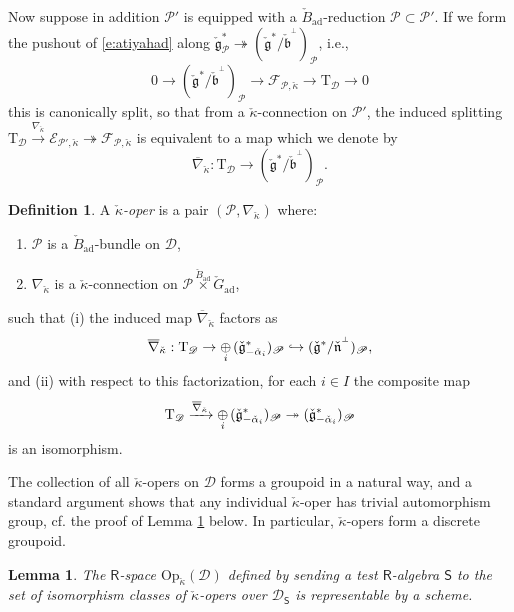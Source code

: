 \documentclass{amsart}
\newtheorem{Lem}[Thm]{Lemma}
\theoremstyle{definition}
\newtheorem{defi}[Thm]{Definition}
\newcommand{\fb}{\mathfrak{b}}
\newcommand{\fg}{\mathfrak{g}}
\newcommand{\sD}{\mathscr{D}}
\newcommand{\Sing}{\mathsf{S}}
\newcommand{\on}{\mathrm}
\newcommand{\Ring}{\mathsf{R}}
\newcommand{\sP}{\mathscr{P}}
\newcommand{\ckappa}{\check{\kappa}}
\newcommand{\Op}{\on{Op}}
\numberwithin{equation}{section}
\begin{document}
Now suppose in addition $\sP'$ is equipped with a $\check{B}_{\on{ad}}$-reduction $\sP \subset \sP'$. If we form the pushout of \eqref{e:atiyahad} along $\check{\fg}_{\sP}^* \twoheadrightarrow (\check{\fg}^*/\check{\fb}^{{}^\perp})_{\sP}$, i.e.,  
$$0 \rightarrow (\check{\fg}^*/\check{\fb}^{{}^\perp})_{\sP} \rightarrow \mathscr{F}_{\sP, \ckappa} \rightarrow \on{T}_{\sD} \rightarrow 0$$
this is canonically split, so that from a $\ckappa$-connection on $\sP'$, the induced splitting 
$\on{T}_\sD \xrightarrow{\nabla_{\ckappa}} \mathscr{E}_{\sP', \ckappa} \twoheadrightarrow \mathscr{F}_{\sP, \ckappa}$ 
is equivalent to a map which we denote by
$$\overline{\nabla}_{\ckappa}: \on{T}_{\sD} \rightarrow (\check{\fg}^*/\check{\fb}^{{}^\perp})_{\sP}.$$




\begin{defi} \label{d:kappaoper} A {\em ${\ckappa}$-oper} is a pair $(\sP, \nabla_{\ckappa})$ where:

\begin{enumerate}
\item $\sP$ is a $\check{B}_{\on{ad}}$-bundle on $\sD$, 
\item $\nabla_{\ckappa}$ is a ${\ckappa}$-connection on $\sP \overset{\check{B}_{\on{ad}}} \times \check{G}_{\on{ad}}$,
\end{enumerate}
such that (i) the induced map $\overline{\nabla}_{\ckappa}$ factors as $$\overline{\nabla}_{\ckappa}: \on{T}_\sD \rightarrow \underset{i} \oplus \hspace{.5mm} (\check{\fg}^*_{-\check{\alpha}_i})_{\sP} \hookrightarrow (\check{\fg}^*/\check{\mathfrak{n}}^{{}^\perp})_{\sP},$$and (ii) with respect to this factorization, for each $i \in I$ the composite map 
$$\on{T}_\sD \xrightarrow{\overline{\nabla}_{\ckappa}}  \underset{i} \oplus \hspace{.5mm} (\check{\fg}^*_{-\check{\alpha}_i})_{\sP} \twoheadrightarrow (\check{\fg}^*_{-\check{\alpha}_i})_{\sP}$$
is an isomorphism. 
\end{defi}

The collection of all ${\ckappa}$-opers on $\sD$ forms a groupoid in a natural way, and a standard argument shows that any individual ${\ckappa}$-oper has trivial automorphism group, cf. the proof of Lemma \ref{l:kosslice} below. In particular, ${\ckappa}$-opers form a discrete groupoid. 

\begin{Lem} \label{l:kosslice} The $\Ring$-space $\Op_{\ckappa}(\sD)$ defined by sending a test $\Ring$-algebra $\Sing$ to the set of isomorphism classes of $\ckappa$-opers over $\sD_\Sing$ is representable by a scheme. \end{Lem}
\end{document}
